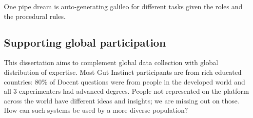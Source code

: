 One pipe dream is auto-generating galileo for different tasks given the roles and the procedural rules.




%
%

\subsection{Supporting global participation}
This dissertation aims to complement global data collection with global distribution of expertise. Most Gut Instinct participants are from rich educated countries: 80\% of Docent questions were from people in the developed world and all 3 experimenters had advanced degrees. People not represented on the platform across the world have different ideas and insights; we are missing out on those. How can such systems be used by a more diverse population?

